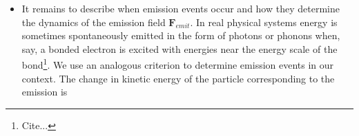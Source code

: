 \documentclass[12pt,letterpaper]{article}
\newcommand{\mb}{\mathbf}
\begin{document}
\begin{itemize}
\begin{align*}
W_{\mb{R}\mb{R}'} &= {1 \over m}(\mb{p}_{i,ne} \cdot \mb{e}).
\end{align*} Note that this is consistent with our expression for the momentum $\mb{p}'_{i}$ because an emission event can only occur if the shift vector $\mb{e}$ is $\mb{0}$. Then the heat $\Delta Q_{\mb{R}\mb{R}'}$ released into the bath in the transition between $\mb{R}'$ and $\mb{R}$ is
\begin{align*}
\Delta Q_{\mb{R}\mb{R}'} &= W_{\mb{R}\mb{R}'} - \Delta E_{\mb{R}\mb{R}'} \\
&= W_{\mb{R}\mb{R}'} - \Delta K_{\mb{R}\mb{R}'} - \Delta U_{\mb{R}\mb{R}'} \\
&= {1 \over m}(\mb{p}_{i,ne} \cdot \mb{e}) - {1 \over 2m}(|\mb{p}_{i,ne}|^{2} - |\mb{p}_{i}|^{2}) - (U(\mb{R}') - U(\mb{R})) \\
&= {1 \over m}(\mb{p}_{i,ne} \cdot \mb{e}) - {1 \over 2m}(|\mb{p}_{i,ne}|^{2} - |\mb{p}_{i}|^{2}) - (U(\mb{r}'_{i}; i) - U(\mb{r}_{i}; i)),
\end{align*}
where $\Delta E_{\mb{R}\mb{R}'}$ is the energy difference between $\mb{R}'$ and $\mb{R}$ and $\Delta U_{\mb{R}\mb{R}'}$ is the potential energy difference between $\mb{R}'$ and $\mb{R}$. Following non-equilibrium Boltzmann thermodynamics\footnote{Cite England, etc.} we take
\begin{align*}
P(\mb{R}' \mid \mb{R}) = {1 \over Z}e^{\beta\Delta Q_{\mb{R}\mb{R}'}},
\end{align*}
where $Z$ is the partition function
\begin{align*}
Z = \sum_{\mb{R}'}e^{\beta\Delta Q_{\mb{R}\mb{R}'}} = \sum_{\mb{e}}e^{\beta\Delta Q_{\mb{R}\mb{R}'}}.
\end{align*}
\item It remains to describe when emission events occur and how they determine the dynamics of the emission field $\mb{F}_{emit}$. In real physical systems energy is sometimes spontaneously emitted in the form of photons or phonons when, say, a bonded electron is excited with energies near the energy scale of the bond\footnote{Cite...}. We use an analogous criterion to determine emission events in our context. The change in kinetic energy of the particle corresponding to the emission is

\end{itemize}
\end{document}
